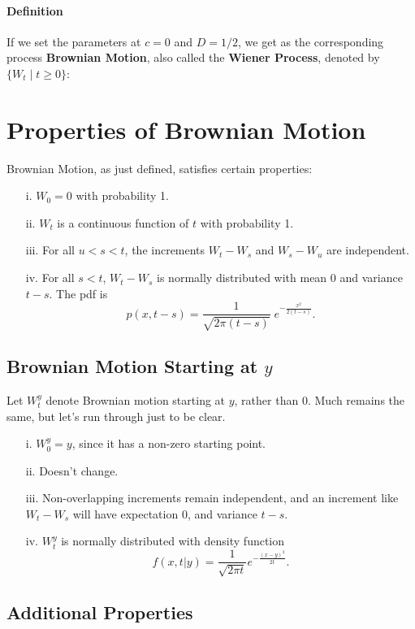 \documentclass[a4paper,12pt]{scrartcl}
\begin{document}
\paragraph{Definition} If we set the parameters at $c = 0$ and $D = 1/2$,
we get as the corresponding process \textbf{Brownian Motion}, also 
called the \textbf{Wiener Process}, denoted by $\{ W_t\;|\; t\geq 0\}$:

\section{Properties of Brownian Motion}

Brownian Motion, as just defined, satisfies certain properties:
\begin{enumerate}
   \item[i.]{$W_0 = 0$ with probability 1.}
   \item[ii.]{$W_t$ is a continuous function of $t$ with probability 1.}
   \item[iii.]{For all $u < s < t$, the increments $W_t - W_s$ and
      $W_s - W_u$ are independent.}
   \item[iv.]{For all $s <t$, $W_t - W_s$ is normally distributed with
      mean $0$ and variance $t-s$.  The pdf is
      \[ p(x,t-s) =  \frac{1}{\sqrt{2\pi (t-s)}} \; 
	 e^{-\frac{x^2}{2(t-s)}}.\]
      }
\end{enumerate}

\subsection{Brownian Motion Starting at $y$}

Let $W^y_t$ denote Brownian motion starting at $y$, rather than $0$. 
Much remains the same, but let's run through just to be clear.
\begin{enumerate}
   \item[i.]{$W^y_0 = y$, since it has a non-zero starting point.}
   \item[ii.]{Doesn't change.}
   \item[iii.]{Non-overlapping increments remain independent, and an
      increment like $W_t - W_s$ will have 
      expectation $0$, and variance $t - s$.}
   \item[iv.]{ $W^y_t$ is normally distributed with density function
      \[ f(x,t|y) = \frac{1}{\sqrt{2\pi t}} e^{-\frac{(x-y)^2}{2t}}.\]
      }
\end{enumerate}

\subsection{Additional Properties}
\end{document}
